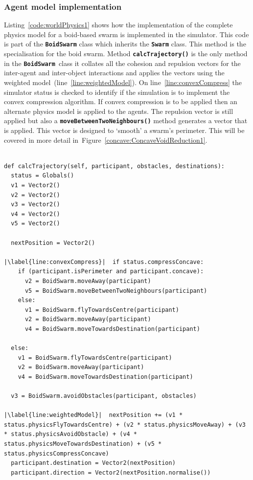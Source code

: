\subsubsection{Agent model implementation}
Listing~\ref{code:worldPhysics1} shows how the implementation of the complete physics model for a boid-based swarm is implemented in the simulator. This code is part of the \texttt{\textbf{BoidSwarm}} class which inherits the \texttt{\textbf{Swarm}} class. This method is the specialisation for the boid swarm. Method \texttt{\textbf{calcTrajectory()}} is the only method in the \texttt{\textbf{BoidSwarm}}~class it collates all the cohesion and repulsion vectors for the inter-agent and inter-object interactions and applies the vectors using the weighted model~(line~\ref{line:weightedModel}). On line~\ref{line:convexCompress} the simulator status is checked to identify if the simulation is to implement the convex compression algorithm. If convex compression is to be applied then an alternate physics model is applied to the agents. The repulsion vector is still applied but also a \texttt{\textbf{moveBetweenTwoNeighbours()}} method generates a vector that is applied. This vector is designed to `smooth' a swarm's perimeter. This will be covered in more detail in~Figure~\ref{concave:ConcaveVoidReduction1}.

\lstset{language=Python,
basicstyle=\tiny,
numbers=left, 
numberstyle=\tiny,
captionpos=b,
frame=single,
breaklines=true,
caption=Agent trajectory code,
escapechar=|
} %
\begin{lstlisting}[label={code:worldPhysics1}]  % Start your code-block

def calcTrajectory(self, participant, obstacles, destinations):
  status = Globals()
  v1 = Vector2()
  v2 = Vector2()
  v3 = Vector2()
  v4 = Vector2()
  v5 = Vector2()

  nextPosition = Vector2()
        
|\label{line:convexCompress}|  if status.compressConcave:
    if (participant.isPerimeter and participant.concave):
      v2 = BoidSwarm.moveAway(participant)
      v5 = BoidSwarm.moveBetweenTwoNeighbours(participant)
    else:
      v1 = BoidSwarm.flyTowardsCentre(participant)
      v2 = BoidSwarm.moveAway(participant)
      v4 = BoidSwarm.moveTowardsDestination(participant)

  else:
    v1 = BoidSwarm.flyTowardsCentre(participant)            
    v2 = BoidSwarm.moveAway(participant)
    v4 = BoidSwarm.moveTowardsDestination(participant)

  v3 = BoidSwarm.avoidObstacles(participant, obstacles)

|\label{line:weightedModel}|  nextPosition += (v1 * status.physicsFlyTowardsCentre) + (v2 * status.physicsMoveAway) + (v3 * status.physicsAvoidObstacle) + (v4 * status.physicsMoveTowardsDestination) + (v5 * status.physicsCompressConcave)
  participant.destination = Vector2(nextPosition)
  participant.direction = Vector2(nextPosition.normalise())
\end{lstlisting}

